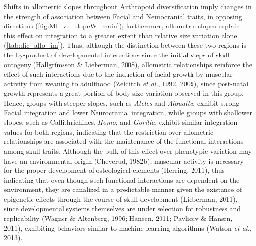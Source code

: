 \documentclass[12pt,twoside]{report}
\begin{document}
Shifts in allometric slopes throughout Anthropoid diversification imply
changes in the strength of association between Facial and Neurocranial
traits, in opposing directions (\autoref{fig:MI_vs_slopeW_main});
furthermore, allometric slopes explain this effect on integration to a
greater extent than relative size variation alone
(\autoref{tab:dic_allo_im}). Thus, although the distinction between
these two regions is the by-product of developmental interactions since
the initial steps of skull ontogeny (Hallgrímsson \& Lieberman, 2008),
allometric relationships reinforce the effect of such interactions due
to the induction of facial growth by muscular activity from weaning to
adulthood (Zelditch \emph{et al.}, 1992, 2009), since post-natal growth
represents a great portion of body size variation observed in this
group. Hence, groups with steeper slopes, such as \emph{Ateles} and
\emph{Alouatta}, exhibit strong Facial integration and lower
Neurocranial integration, while groups with shallower slopes, such as
Callithrichines, \emph{Homo}, and \emph{Gorilla}, exhibit similar
integration values for both regions, indicating that the restriction
over allometric relationships are associated with the maintenance of the
functional interactions among skull traits. Although the bulk of this
effect over phenotypic variation may have an environmental origin
(Cheverud, 1982b), muscular activity is necessary for the proper
development of osteological elements (Herring, 2011), thus indicating
that even though such functional interactions are dependent on the
environment, they are canalized in a predictable manner given the
existance of epigenetic effects through the course of skull development
(Lieberman, 2011), since developmental systems themselves are under
selection for robustness and replicability (Wagner \& Altenberg, 1996;
Hansen, 2011; Pavlicev \& Hansen, 2011), exhibiting behaviors similar to
machine learning algorithms (Watson \emph{et al.}, 2013).
\end{document}
